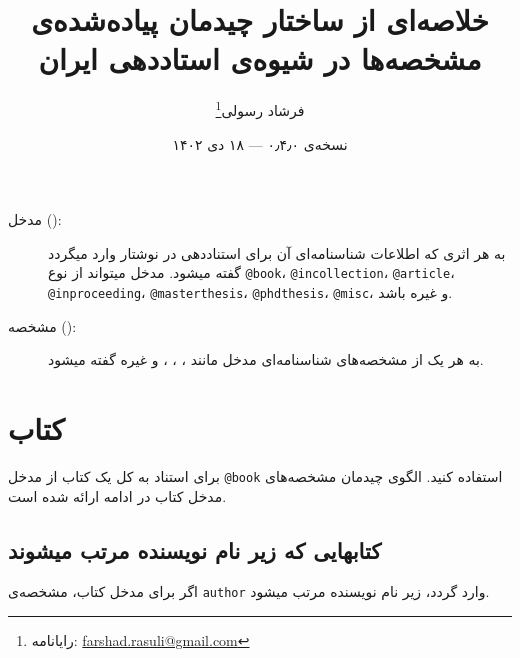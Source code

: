 \documentclass[a4paper,11pt]{article}
\begin{document}
\title{خلاصه‌ای از ساختار چیدمان پیاده‌شده‌ی مشخصه‌ها در شیوه‌ی  استاددهی ایران}
\author{فرشاد رسولی\thanks{رایانامه: \url{farshad.rasuli@gmail.com}}}
\date{نسخه‌ی ۰٫۴٫۰ --- ۱۸ دی ۱۴۰۲}
\maketitle


\begin{description}
\item[مدخل ():]
به هر اثری که اطلاعات شناسنامه‌ای آن برای استناددهی  در نوشتار وارد میگردد گفته میشود. مدخل میتواند از نوع \verb|@book|، \verb|@incollection|، \verb|@article|، \verb|@inproceeding|، \verb|@masterthesis|، \verb|@phdthesis|، \verb|@misc|، و غیره باشد.
\item[مشخصه ():]
به هر یک از مشخصه‌های شناسنامه‌ای مدخل مانند ، ، ، و غیره گفته میشود.
\end{description}



\renewcommand{\contentsname}{فهرست}
\tableofcontents










\section{کتاب}
برای استناد به کل یک کتاب از مدخل \verb|@book| استفاده کنید. الگوی چیدمان مشخصه‌های مدخل کتاب در ادامه ارائه شده است.





\subsection{کتابهایی که زیر نام نویسنده مرتب میشوند}
اگر برای مدخل کتاب، مشخصه‌ی \verb|author| وارد گردد، زیر نام نویسنده مرتب میشود.
\end{document}
